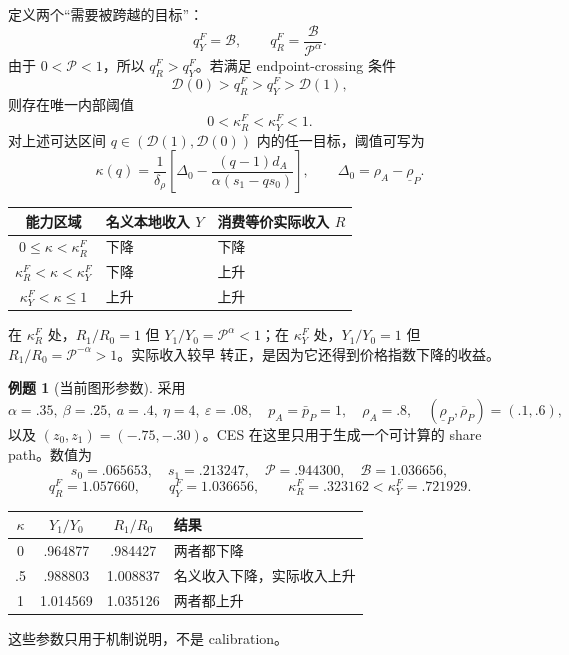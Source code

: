 \documentclass[UTF8,11pt,scheme=chinese,fontset=windows]{ctexart}
\newcommand{\calB}{\mathcal B}
\newcommand{\calD}{\mathcal D}
\newcommand{\calP}{\mathcal P}
\theoremstyle{definition}
\newtheorem{workedexample}{例题}[section]
\begin{document}
定义两个“需要被跨越的目标”：
\[
q_Y^F=\calB,
\qquad
q_R^F=\frac{\calB}{\calP^\alpha}.
\]
由于 \(0<\calP<1\)，所以 \(q_R^F>q_Y^F\)。若满足 endpoint-crossing 条件
\[
\boxed{\calD(0)>q_R^F>q_Y^F>\calD(1),}
\]
则存在唯一内部阈值
\[
0<\kappa_R^F<\kappa_Y^F<1.
\]
对上述可达区间 \(q\in(\calD(1),\calD(0))\) 内的任一目标，阈值可写为
\[
\kappa(q)=\frac1{\delta_\rho}
\left[\Delta_0-
\frac{(q-1)d_A}{\alpha(s_1-qs_0)}\right],
\qquad
\Delta_0=\rho_A-\underline\rho_P.
\]

\begin{center}
\small
\begin{tabular}{cll}
\toprule
能力区域 & 名义本地收入 \(Y\) & 消费等价实际收入 \(R\) \\
\midrule
\(0\leq\kappa<\kappa_R^F\) & 下降 & 下降 \\
\(\kappa_R^F<\kappa<\kappa_Y^F\) & 下降 & 上升 \\
\(\kappa_Y^F<\kappa\leq1\) & 上升 & 上升 \\
\bottomrule
\end{tabular}
\end{center}

在 \(\kappa_R^F\) 处，\(R_1/R_0=1\) 但 \(Y_1/Y_0=\calP^\alpha<1\)；在
\(\kappa_Y^F\) 处，\(Y_1/Y_0=1\) 但 \(R_1/R_0=\calP^{-\alpha}>1\)。实际收入较早
转正，是因为它还得到价格指数下降的收益。

\begin{workedexample}[当前图形参数]
采用
\[
\alpha=.35,\ \beta=.25,\ a=.4,\ \eta=4,\ \varepsilon=.08,
\quad p_A=\bar p_P=1,
\quad \rho_A=.8,
\quad (\underline\rho_P,\overline\rho_P)=(.1,.6),
\]
以及 \((z_0,z_1)=(-.75,-.30)\)。CES 在这里只用于生成一个可计算的 share path。数值为
\[
s_0=.065653,\quad s_1=.213247,\quad
\calP=.944300,\quad \calB=1.036656,
\]
\[
q_R^F=1.057660,\qquad q_Y^F=1.036656,
\qquad
\boxed{\kappa_R^F=.323162<\kappa_Y^F=.721929.}
\]

\begin{center}
\begin{tabular}{cccl}
\toprule
\(\kappa\) & \(Y_1/Y_0\) & \(R_1/R_0\) & 结果 \\
\midrule
0 & .964877 & .984427 & 两者都下降 \\
.5 & .988803 & 1.008837 & 名义收入下降，实际收入上升 \\
1 & 1.014569 & 1.035126 & 两者都上升 \\
\bottomrule
\end{tabular}
\end{center}
这些参数只用于机制说明，不是 calibration。
\end{workedexample}
\end{document}

